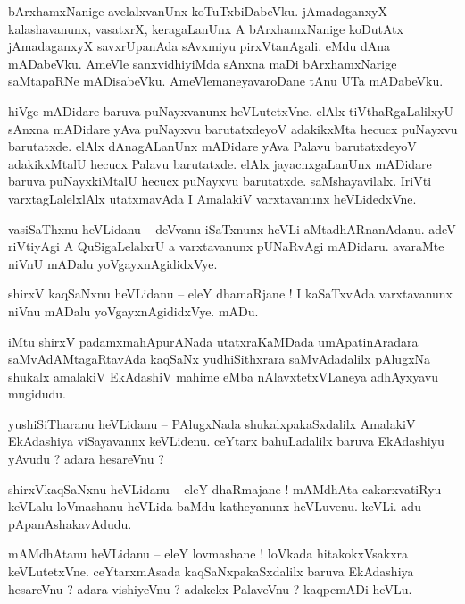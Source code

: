 \documentclass{article}
\begin{document}
\begin{mn}%
bArxhamxNanige avelalxvanUnx koTuTxbiDabeVku. jAmadaganxyX kalashavanunx, vasatxrX, keragaLanUnx A 
bArxhamxNanige koDutAtx jAmadaganxyX savxrUpanAda sAvxmiyu pirxVtanAgali. eMdu dAna mADabeVku. 
AmeVle sanxvidhiyiMda sAnxna maDi bArxhamxNarige saMtapaRNe mADisabeVku. AmeVlemaneyavaroDane tAnu 
UTa mADabeVku.
\end{mn}

\begin{mn}%
hiVge mADidare baruva puNayxvanunx heVLutetxVne. elAlx tiVthaRgaLalilxyU sAnxna mADidare yAva 
puNayxvu barutatxdeyoV adakikxMta hecucx puNayxvu barutatxde. elAlx dAnagALanUnx mADidare yAva 
Palavu barutatxdeyoV adakikxMtalU hecucx Palavu barutatxde. elAlx jayacnxgaLanUnx mADidare baruva 
puNayxkiMtalU hecucx puNayxvu barutatxde. saMshayavilalx. IriVti varxtagLalelxlAlx utatxmavAda I 
AmalakiV varxtavanunx heVLidedxVne.
\end{mn}

\begin{mn}%
vasiSaThxnu heVLidanu -- deVvanu iSaTxnunx heVLi aMtadhARnanAdanu. adeV riVtiyAgi A QuSigaLelalxrU 
a varxtavanunx pUNaRvAgi mADidaru. avaraMte niVnU mADalu yoVgayxnAgididxVye.
\end{mn}

\begin{mn}%
shirxV kaqSaNxnu heVLidanu -- eleY dhamaRjane ! I kaSaTxvAda varxtavanunx niVnu mADalu 
yoVgayxnAgididxVye. mADu.
\end{mn}

 iMtu shirxV padamxmahApurANada utatxraKaMDada umApatinAradara saMvAdAMtagaRtavAda kaqSaNx 
 yudhiSithxrara saMvAdadalilx pAlugxNa shukalx amalakiV EkAdashiV mahime eMba nAlavxtetxVLaneya 
 adhAyxyavu mugidudu.

\begin{mn}%
yushiSiTharanu heVLidanu -- PAlugxNada shukalxpakaSxdalilx AmalakiV EkAdashiya viSayavannx 
keVLidenu. ceYtarx bahuLadalilx baruva EkAdashiyu yAvudu ? adara hesareVnu ?
\end{mn}

\begin{mn}%
shirxVkaqSaNxnu heVLidanu -- eleY dhaRmajane ! mAMdhAta cakarxvatiRyu keVLalu loVmashanu heVLida 
baMdu katheyanunx heVLuvenu. keVLi. adu pApanAshakavAdudu.
\end{mn}

\begin{mn}%
mAMdhAtanu heVLidanu -- eleY lovmashane ! loVkada hitakokxVsakxra keVLutetxVne. ceYtarxmAsada 
kaqSaNxpakaSxdalilx baruva EkAdashiya hesareVnu ? adara vishiyeVnu ? adakekx PalaveVnu ? kaqpemADi 
heVLu.
\end{mn}
\end{document}
